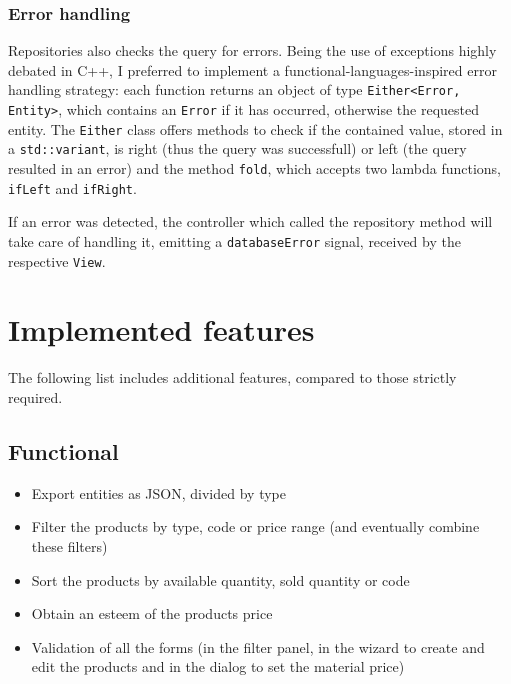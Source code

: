 \documentclass[10pt]{article}
\begin{document}
\subsubsection{Error handling}
Repositories also checks the query for errors. Being the use of exceptions
highly debated in C++, I preferred to implement a functional-languages-inspired
error handling strategy: each function returns an object of type
\texttt{Either<Error, Entity>}, which contains an \texttt{Error} if it has
occurred, otherwise the requested entity. The \texttt{Either} class offers
methods to check if the contained value, stored in a \texttt{std::variant}, is
right (thus the query was successfull) or left (the query resulted in an error)
and the method \texttt{fold}, which accepts two lambda functions,
\texttt{ifLeft} and \texttt{ifRight}.

If an error was detected, the controller which called the repository method
will take care of handling it, emitting a \texttt{databaseError} signal,
received by the respective \texttt{View}.

\section{Implemented features}
The following list includes additional features, compared to those strictly
required.
\subsection{Functional}
\begin{itemize}
    \item Export entities as JSON, divided by type
    \item Filter the products by type, code or price range (and eventually combine these
          filters)
    \item Sort the products by available quantity, sold quantity or code
    \item Obtain an esteem of the products price
    \item Validation of all the forms (in the filter panel, in the wizard to create and
          edit the products and in the dialog to set the material price)
\end{itemize}
\end{document}

